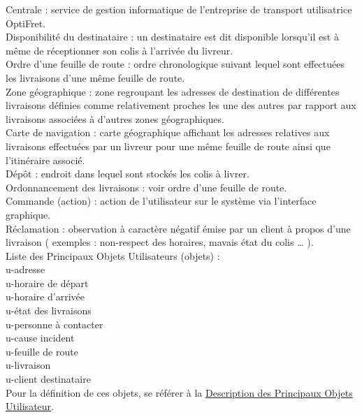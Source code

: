 \documentclass{report}
\begin{document}
\begin{appendices}
Centrale : service de gestion informatique de l’entreprise de transport utilisatrice OptiFret.\\

Disponibilité du destinataire : un destinataire est dit disponible lorsqu’il est à même de réceptionner son colis à l’arrivée du livreur.\\

Ordre d’une feuille de route : ordre chronologique suivant lequel sont effectuées les livraisons d’une même feuille de route.\\

Zone géographique : zone regroupant les adresses de destination de différentes livraisons définies comme relativement proches les une des autres par rapport aux livraisons associées à d’autres zones géographiques.\\

Carte de navigation : carte géographique affichant les adresses relatives aux livraisons effectuées par un livreur pour une même feuille de route ainsi que l’itinéraire associé.\\

Dépôt : endroit dans lequel sont stockés les colis à livrer.\\

Ordonnancement des livraisons : voir ordre d’une feuille de route.\\

Commande (action) : action de l’utilisateur sur le système via l’interface graphique.\\

Réclamation : observation à caractère négatif émise par un client à propos d’une livraison ( exemples : non-respect des horaires, mavais état du colis … ).\\


Liste des Principaux Objets Utilisateurs (objets) :\\
u-adresse \\
u-horaire de départ\\
u-horaire d’arrivée\\
u-état des livraisons\\
u-personne à contacter\\
u-cause incident\\
u-feuille de route\\
u-livraison\\
u-client destinataire\\
Pour la définition de ces objets, se référer à la \hyperlink{labDPOU}{Description des Principaux Objets Utilisateur}.\\


\end{appendices}
\end{document}
